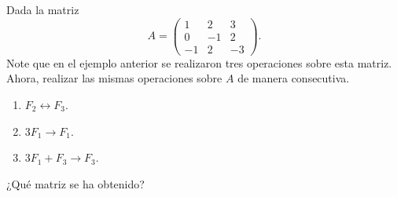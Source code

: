 \documentclass[compacto,10pt]{pubciencias-notas}
\begin{document}
    
    


\begin{ejer}\hspace{0pt}\label{Ejer:OpeELe1}   
Dada la matriz
\[
    A=\begin{pmatrix}
           1&2&3 \\
           0&-1&2\\
           -1&2&-3
           \end{pmatrix}.
\]
Note que en el ejemplo anterior se realizaron tres operaciones sobre esta matriz. Ahora, realizar las mismas operaciones sobre $A$ de manera consecutiva. 
\begin{enumerate}
\item $F_{2} \leftrightarrow F_{3}$.
\item $3F_{1} \rightarrow F_{1}$.
\item $3F_{1} + F_{3} \rightarrow F_{3}$.
\end{enumerate}
¿Qué matriz se ha obtenido?
\end{ejer}



\end{document}
